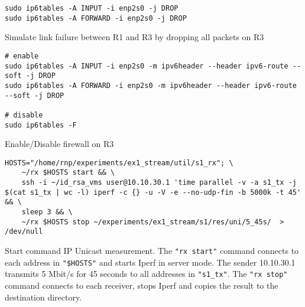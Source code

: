 \begin{listing}[h]
\begin{verbatim}
sudo ip6tables -A INPUT -i enp2s0 -j DROP
sudo ip6tables -A FORWARD -i enp2s0 -j DROP
\end{verbatim}
\caption{Simulate link failure between R1 and R3 by dropping all packets on R3}
\label{lst:r3_link_failure}
\end{listing}


\begin{listing}[h]
\begin{verbatim}
# enable
sudo ip6tables -A INPUT -i enp2s0 -m ipv6header --header ipv6-route --soft -j DROP
sudo ip6tables -A FORWARD -i enp2s0 -m ipv6header --header ipv6-route --soft -j DROP

# disable
sudo ip6tables -F
\end{verbatim}
\caption{Enable/Disable firewall on R3}
\label{lst:r3_fw}
\end{listing}

\begin{listing}[h]
\begin{verbatim}
HOSTS="/home/rnp/experiments/ex1_stream/util/s1_rx"; \
    ~/rx $HOSTS start && \
    ssh -i ~/id_rsa_vms user@10.10.30.1 'time parallel -v -a s1_tx -j $(cat s1_tx | wc -l) iperf -c {} -u -V -e --no-udp-fin -b 5000k -t 45' && \
    sleep 3 && \
    ~/rx $HOSTS stop ~/experiments/ex1_stream/s1/res/uni/5_45s/  > /dev/null
\end{verbatim}
    \caption[Start command IP Unicast measurement]{Start command IP Unicast measurement.
        The \texttt{"rx start"} command connects to each address in \texttt{"\$HOSTS"} and starts Iperf in server mode.
        The sender 10.10.30.1 transmits 5 Mbit/s for 45 seconds to all addresses in \texttt{"s1\_tx"}.
        The \texttt{"rx stop"} command connects to each receiver, stops Iperf and copies the result to the destination directory.
    }
\label{lst:uni_start_cmd}
\end{listing}

